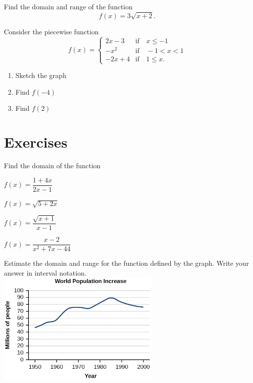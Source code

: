 \newpage

\begin{example}
  Find the domain and range of the function
  $$f(x)=3\sqrt{x+2}.$$
\end{example}


\begin{example}
  Consider the piecewise function
  $$
  f(x)=\begin{cases}
    2x-3 & \text{if}\quad x\le -1\\
    -x^2 & \text{if}\quad -1<x< 1\\
    -2x+4 & \text{if}\quad 1\le x.
  \end{cases}
  $$
  \begin{enumerate}[threecol]
    \item Sketch the graph
    \item Find $f(-4)$
    \item Find $f(2)$
  \end{enumerate}
\end{example}

\newpage

\section*{Exercises}

\begin{exercise}
  Find the domain of the function\\
  \begin{enumerate*}
    \item  $f(x)=\dfrac{1+4x}{2x-1}$ 
    \item  $f(x)=\sqrt{5+2x}$
    \item  $f(x)=\dfrac{\sqrt{x+1}}{x-1}$
    \item $f(x)=\dfrac{x-2}{x^2+7x-44}$
  \end{enumerate*}
\end{exercise}

\begin{exercise}
  Estimate the domain and range for the function defined by the graph. Write your answer in interval notation.\\
  \includegraphics[width=0.6\textwidth]{figs/CNX_Precalc_Figure_01_02_010.jpg}
\end{exercise}
\vspace*{-5\baselineskip}


